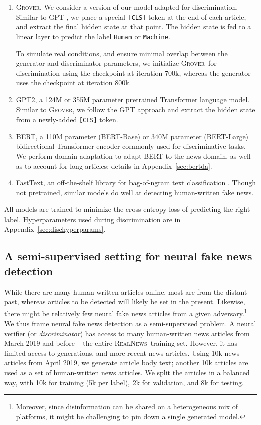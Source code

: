\documentclass{article}
\newcommand{\modelnamefordisc}{{\textsc{Grover}}}
\newcommand{\datasetname}{{\textsc{RealNews}}}
\begin{document}
\begin{enumerate}[wide, leftmargin=10pt, labelwidth=!,labelindent=-2pt,itemsep=1pt,topsep=0pt,label=\textbf{\alph*}.]
    \item \modelnamefordisc. We consider a version of our model adapted for discrimination. Similar to GPT \citep{radford2018improving}, we place a special {\small\tt [CLS]} token at the end of each article, and extract the final hidden state at that point. The hidden state is fed to a linear layer to predict the label {\tt\small Human} or {\tt\small Machine}. 
    
    To simulate real conditions, and ensure minimal overlap between the generator and discriminator parameters, we initialize \modelnamefordisc~for discrimination using the checkpoint at iteration 700k, whereas the generator uses the checkpoint at iteration 800k.
    \item GPT2, a 124M or 355M parameter pretrained Transformer language model. Similar to \modelnamefordisc, we follow the GPT approach and extract the hidden state from a newly-added  {\small\tt [CLS]} token.
    \item BERT, a 110M parameter (BERT-Base) or 340M parameter (BERT-Large) bidirectional Transformer encoder commonly used for discriminative tasks. We perform domain adaptation to adapt BERT to the news domain, as well as to account for long articles; details in Appendix~\ref{sec:bertda}.
    \item FastText, an off-the-shelf library for bag-of-ngram text classification \citep{joulin2017bag}. Though not pretrained, similar models do well at detecting human-written fake news.
\end{enumerate}
All models are trained to minimize the cross-entropy loss of predicting the right label. Hyperparameters used during discrimination are in Appendix~\ref{sec:dischyperparams}.


\subsection{A semi-supervised setting for neural fake news detection}
While there are many human-written articles online, most are from the distant past, whereas articles to be detected will likely be set in the present. Likewise, there might be relatively few neural fake news articles from a given adversary.\footnote{Moreover, since disinformation can be shared on a heterogeneous mix of platforms, it might be challenging to pin down a single generated model.} We thus frame neural fake news detection as a semi-supervised problem. A neural verifier (or \emph{discriminator}) has access to many human-written news articles from March 2019 and before -- the entire \datasetname~training set. However, it has limited access to generations, and more recent news articles. Using 10k news articles from April 2019, we generate article body text; another 10k articles are used as a set of human-written news articles. We split the articles in a balanced way, with 10k for training (5k per label), 2k for validation, and 8k for testing.
\end{document}

